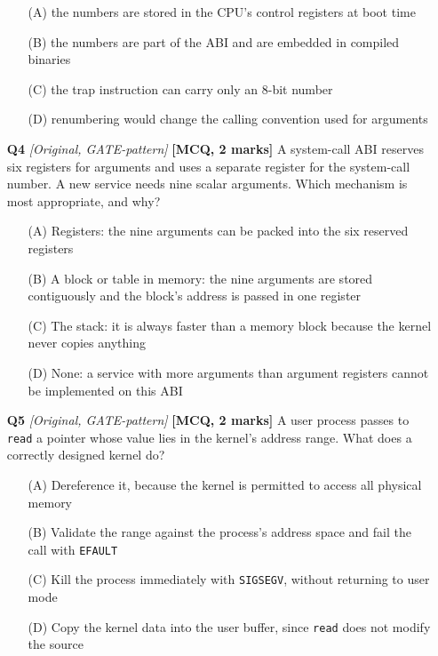 \documentclass[11pt]{article}
\begin{document}
\begin{enumerate}
\begin{enumerate}
  \item[(A)] the numbers are stored in the CPU's control registers at boot time
  \item[(B)] the numbers are part of the ABI and are embedded in compiled binaries
  \item[(C)] the trap instruction can carry only an 8-bit number
  \item[(D)] renumbering would change the calling convention used for arguments
\end{enumerate}

\item[\textbf{Q4}] \textit{[Original, GATE-pattern]} \textbf{[MCQ, 2 marks]} A system-call ABI reserves six registers for arguments and uses a separate register for the system-call number. A new service needs nine scalar arguments. Which mechanism is most appropriate, and why?

\begin{enumerate}
  \item[(A)] Registers: the nine arguments can be packed into the six reserved registers
  \item[(B)] A block or table in memory: the nine arguments are stored contiguously and the block's address is passed in one register
  \item[(C)] The stack: it is always faster than a memory block because the kernel never copies anything
  \item[(D)] None: a service with more arguments than argument registers cannot be implemented on this ABI
\end{enumerate}

\item[\textbf{Q5}] \textit{[Original, GATE-pattern]} \textbf{[MCQ, 2 marks]} A user process passes to \texttt{read} a pointer whose value lies in the kernel's address range. What does a correctly designed kernel do?

\begin{enumerate}
  \item[(A)] Dereference it, because the kernel is permitted to access all physical memory
  \item[(B)] Validate the range against the process's address space and fail the call with \texttt{EFAULT}
  \item[(C)] Kill the process immediately with \texttt{SIGSEGV}, without returning to user mode
  \item[(D)] Copy the kernel data into the user buffer, since \texttt{read} does not modify the source
\end{enumerate}


\end{enumerate}
\end{document}

